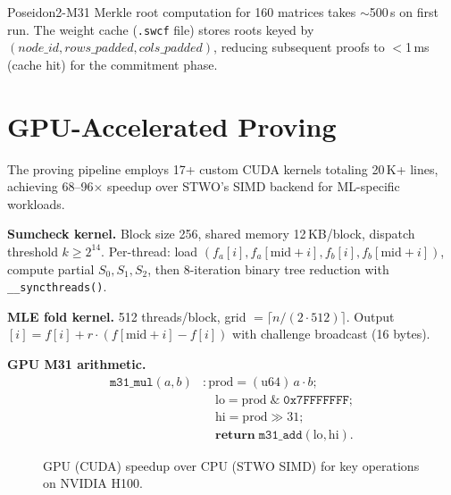\documentclass[10pt,twocolumn]{article}
\theoremstyle{definition}
\theoremstyle{remark}
\begin{document}
Poseidon2-M31 Merkle root computation for 160 matrices takes
$\sim$500\,s on first run.
The weight cache (\texttt{.swcf} file) stores roots keyed by
$(node\_id, rows\_padded, cols\_padded)$, reducing subsequent
proofs to $<$1\,ms (cache hit) for the commitment phase.


\section{GPU-Accelerated Proving}\label{sec:gpu}

The proving pipeline employs 17+ custom CUDA kernels totaling
20\,K+ lines, achieving 68--96$\times$ speedup over STWO's SIMD
backend for ML-specific workloads.

\textbf{Sumcheck kernel.}
Block size 256, shared memory 12\,KB/block, dispatch threshold
$k\ge 2^{14}$.
Per-thread: load $(f_a[i], f_a[\text{mid}+i], f_b[i], f_b[\text{mid}+i])$,
compute partial $S_0, S_1, S_2$, then 8-iteration binary tree
reduction with \texttt{\_\_syncthreads()}.

\textbf{MLE fold kernel.}
512 threads/block, grid $= \lceil n/(2\cdot 512)\rceil$.
Output $[i] = f[i] + r\cdot(f[\text{mid}+i]-f[i])$ with challenge
broadcast (16 bytes).

\textbf{GPU M31 arithmetic.}
\begin{align*}
  \texttt{m31\_mul}(a,b) &: \text{prod} = (\text{u64})\,a\cdot b; \\
  &\quad \text{lo} = \text{prod}\;\&\;\texttt{0x7FFFFFFF}; \\
  &\quad \text{hi} = \text{prod}\gg 31; \\
  &\quad \textbf{return}\;\texttt{m31\_add}(\text{lo},\text{hi}).
\end{align*}

\begin{figure}[t]
  \centering
  \caption{GPU (CUDA) speedup over CPU (STWO SIMD) for key operations
           on NVIDIA H100.}
  \label{fig:gpu-speedup}
\end{figure}
\end{document}
